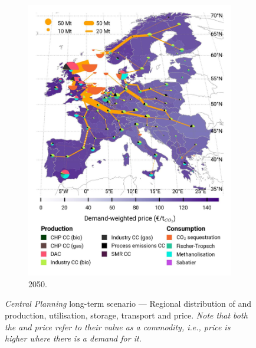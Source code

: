 \documentclass[preprint,12pt,sort&compress]{elsarticle}
\begin{document}
\begin{figure}[htbp]
\begin{subfigure}[t]{0.33\textwidth}
      \includegraphics[width=1\textwidth]{maps/greenfield-pipelines/base_s_adm___2050-balance_map_co2_stored} 
      \caption{ 2050.}
      \label{fig:CP_lt_2050_co2}
  \end{subfigure}
  \vspace{0.3cm}
  \caption{\textit{Central Planning} long-term scenario --- Regional distribution of  and  production, utilisation, storage, transport and price. \textit{Note that both the  and  price refer to their value as a commodity, i.e., price is higher where there is a demand for it.}}
  \label{fig:CP_lt}
\end{figure}

\clearpage
 
% 
\end{document}
